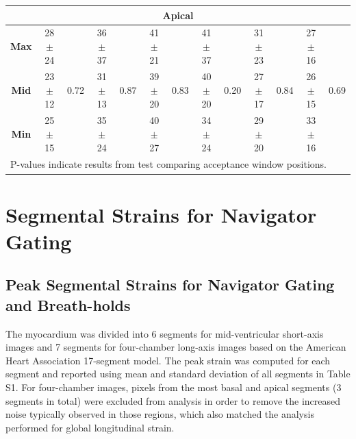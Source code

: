 \begin{appendices}
\begin{table}
\begin{tabular}{ccccccccccccc}
			\multicolumn{13}{c}{\textbf{Apical}} \\
			\midrule
			\textbf{Max} & 28$\pm$24 & \multirow{3}{*}{0.72} & 36$\pm$37 & \multirow{3}{*}{0.87} & 41$\pm$21 & \multirow{3}{*}{0.83}
						 & 41$\pm$37 & \multirow{3}{*}{0.20} & 31$\pm$23 & \multirow{3}{*}{0.84} & 27$\pm$16 & \multirow{3}{*}{0.69} \\
			\textbf{Mid} & 23$\pm$12 &                       & 31$\pm$13 &                       & 39$\pm$20 & 
						 & 40$\pm$20 &                       & 27$\pm$17 &                       & 26$\pm$15 &                       \\
			\textbf{Min} & 25$\pm$15 &                       & 35$\pm$24 &                       & 40$\pm$27 & 
						 & 34$\pm$24 &                       & 29$\pm$20 &                       & 33$\pm$16 &  \\ 
			\bottomrule
			\multicolumn{13}{l}{P-values indicate results from test comparing acceptance window positions.}
		\end{tabular}
	\end{table}
	
	\chapter{Segmental Strains for Navigator Gating}
	\section{Peak Segmental Strains for Navigator Gating and Breath-holds}
	The myocardium was divided into 6 segments for mid-ventricular short-axis images and 7 segments for four-chamber long-axis images based on the American Heart Association 17-segment model. The peak strain was computed for each segment and reported using mean and standard deviation of all segments in Table S1. For four-chamber images, pixels from the most basal and apical segments (3 segments in total) were excluded from analysis in order to remove the increased noise typically observed in those regions, which also matched the analysis performed for global longitudinal strain.
	

\end{appendices}
